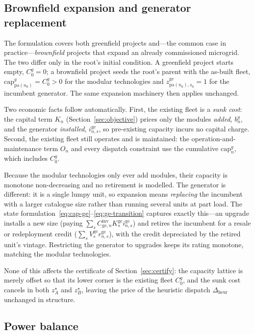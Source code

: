 \documentclass[11pt,a4paper]{article}
\theoremstyle{plain}
\theoremstyle{definition}
\newcommand{\pa}{\mathrm{pa}}
\begin{document}
\subsection{Brownfield expansion and generator replacement}
\label{sec:brownfield}

The formulation covers both greenfield projects and---the common case in
practice---\emph{brownfield} projects that expand an already commissioned microgrid. The
two differ only in the root's initial condition. A greenfield project starts empty,
$C^{g}_0=0$; a brownfield project seeds the root's parent with the as-built fleet,
$\mathrm{cap}^{g}_{\pa(n_0)}=C^{g}_0>0$ for the modular technologies and
$z^{\mathrm{ge}}_{\pa(n_0),s_0}=1$ for the incumbent generator. The same expansion
machinery then applies unchanged.

Two economic facts follow automatically. First, the existing fleet is a \emph{sunk cost}:
the capital term $K_n$ (Section~\ref{sec:objective}) prices only the modules \emph{added},
$b^{g}_n$, and the generator \emph{installed}, $i^{\mathrm{ge}}_{n,s}$, so pre-existing
capacity incurs no capital charge. Second, the existing fleet still operates and is
maintained: the operation-and-maintenance term $O_n$ and every dispatch constraint use the
cumulative $\mathrm{cap}^{g}_n$, which includes $C^{g}_0$.

Because the modular technologies only ever add modules, their capacity is monotone
non-decreasing and no retirement is modelled. The generator is different: it is a single
lumpy unit, so expansion means \emph{replacing} the incumbent with a larger catalogue size
rather than running several units at part load. The state
formulation~\eqref{eq:cap-ge}--\eqref{eq:ge-transition} captures exactly this---an upgrade
installs a new size (paying $\sum_s C^{\mathrm{inv}}_{\mathrm{ge},n}K^{\mathrm{ge}}_s
i^{\mathrm{ge}}_{n,s}$) and retires the incumbent for a resale or redeployment credit
($\sum_s V^{\mathrm{ge}}_s r^{\mathrm{ge}}_{n,s}$), with the credit depreciated by the
retired unit's vintage. Restricting the generator to upgrades keeps its rating monotone,
matching the modular technologies.

None of this affects the certificate of Section~\ref{sec:certify}: the capacity lattice is
merely offset so that its lower corner is the existing fleet $C^{g}_0$, and the sunk cost
cancels in both $z_A^\star$ and $z_B^\star$, leaving the price of the heuristic dispatch
$\Delta_{\mathrm{heur}}$ unchanged in structure.

\subsection{Power balance}
\label{sec:balance}
\end{document}
